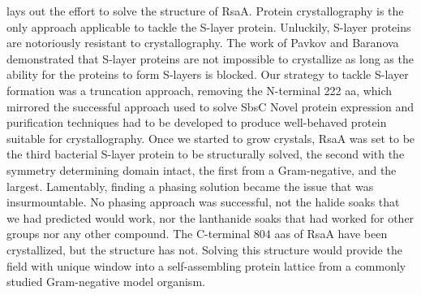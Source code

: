  lays out the effort to solve the structure of RsaA. Protein crystallography is the only approach applicable to tackle the \caulobacter{} \ac{S-layer} protein. Unluckily, \ac{S-layer} proteins are notoriously resistant to crystallography. The work of Pavkov \etal{} and Baranova \etal{} demonstrated that \ac{S-layer} proteins are not impossible to crystallize as long as the ability for the proteins to form \acp{S-layer} is blocked. Our strategy to tackle \ac{S-layer} formation was a truncation approach, removing the N-terminal 222 \ac{aa}, which mirrored the successful approach used to solve SbsC Novel protein expression and purification techniques had to be developed to produce well-behaved protein suitable for crystallography. Once we started to grow crystals, RsaA was set to be the third bacterial \ac{S-layer} protein to be structurally solved, the second with the symmetry determining domain intact, the first from a Gram-negative, and the largest. Lamentably, finding a phasing solution became the issue that was insurmountable. No phasing approach was successful, not the halide soaks that we had predicted would work, nor the lanthanide soaks that had worked for other groups nor any other compound. The C-terminal 804 \acp{aa} of RsaA have been crystallized, but the structure has not. Solving this structure would provide the field with unique window into a self-assembling protein lattice from a commonly studied Gram-negative model organism. 

